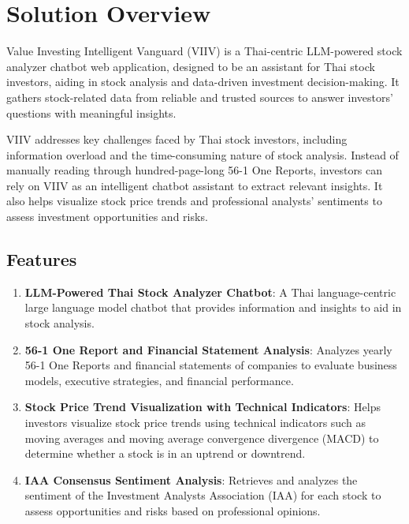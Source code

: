\section{Solution Overview}
\label{section:solution-overview}

Value Investing Intelligent Vanguard (VIIV) is a Thai-centric LLM-powered stock analyzer chatbot web application, designed to be an assistant for Thai stock investors,
aiding in stock analysis and data-driven investment decision-making. It gathers stock-related data from reliable and trusted sources to answer investors' questions with meaningful insights.

VIIV addresses key challenges faced by Thai stock investors, including information overload and the time-consuming nature of stock analysis. 
Instead of manually reading through hundred-page-long 56-1 One Reports, investors can rely on VIIV as an intelligent chatbot assistant to extract relevant insights.
It also helps visualize stock price trends and professional analysts' sentiments to assess investment opportunities and risks.

\subsection{Features}
\label{subsection:features}

\begin{enumerate}[leftmargin=80pt]
    \item \textbf{LLM-Powered Thai Stock Analyzer Chatbot}: A Thai language-centric large language model chatbot that provides information and insights to aid in stock analysis.
    \item \textbf{56-1 One Report and Financial Statement Analysis}: Analyzes yearly 56-1 One Reports and financial statements of companies to evaluate business models, executive strategies, and financial performance.
    \item \textbf{Stock Price Trend Visualization with Technical Indicators}: Helps investors visualize stock price trends using technical indicators such as moving averages and moving average convergence divergence (MACD) to determine whether a stock is in an uptrend or downtrend.
    \item \textbf{IAA Consensus Sentiment Analysis}: Retrieves and analyzes the sentiment of the Investment Analysts Association (IAA) for each stock to assess opportunities and risks based on professional opinions.
\end{enumerate}

